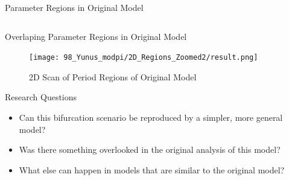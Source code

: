 \begin{frame}{Parameter Regions in Original Model}
\begin{columns}
\begin{column}{0.3 \textwidth}
\begin{center}
{
                }
            \end{center}
        \end{column}
    \end{columns}
\end{frame}




\begin{frame}{Overlaping Parameter Regions in Original Model}
    \begin{figure}
        \centering
        \texttt{[image: 98\_Yunus\_modpi/2D\_Regions\_Zoomed2/result.png]}
        \caption{2D Scan of Period Regions of Original Model}
    \end{figure}
\end{frame}

\begin{frame}{Research Questions}
    \begin{itemize}
        \item Can this bifurcation scenario be reproduced by a simpler, more general model?
        \item Was there something overlooked in the original analysis of this model?
        \item What else can happen in models that are similar to the original model?
    \end{itemize}
\end{frame}
